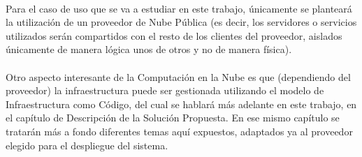 \documentclass[../../memoria.tex]{subfiles}
\begin{document}
\paragraph{}
Para el caso de uso que se va a estudiar en este trabajo, únicamente se planteará la utilización de un proveedor de Nube Pública (es decir, los servidores o servicios utilizados serán compartidos con el resto de los clientes del proveedor, aislados únicamente de manera lógica unos de otros y no de manera física).

\paragraph{}
Otro aspecto interesante de la Computación en la Nube es que (dependiendo del proveedor) la infraestructura puede ser gestionada utilizando el modelo de Infraestructura como Código, del cual se hablará más adelante en este trabajo, en el capítulo de Descripción de la Solución Propuesta. En ese mismo capítulo se tratarán más a fondo diferentes temas aquí expuestos, adaptados ya al proveedor elegido para el despliegue del sistema.
\end{document}
